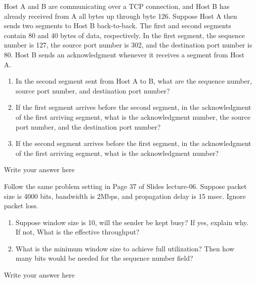 \documentclass{report}
\begin{document}
\begin{problem}

Host A and B are communicating over a TCP connection, and Host B has
already received from A all bytes up through byte 126. Suppose Host A then
sends two segments to Host B back-to-back. The first and second segments
contain 80 and 40 bytes of data, respectively. In the first segment, the
sequence number is 127, the source port number is 302, and the destination
port number is 80. Host B sends an acknowledgment whenever it receives a
segment from Host A.

\begin{enumerate}
\item In the second segment sent from Host A to B, what are the sequence number, source port number, and destination port number?

\item If the first segment arrives before the second segment, in the acknowledgment of the first arriving segment, what is the acknowledgment number, the source port number, and the destination port number?

\item If the second segment arrives before the first segment, in the acknowledgment of the first arriving segment, what is the acknowledgment number?

\end{enumerate}

\begin{answer}{40em}
    Write your answer here
\end{answer}

\end{problem}

\newpage

\begin{problem}
Follow the same problem setting in Page 37 of Slides lecture-06. Suppose packet size is 4000 bits, bandwidth is 2Mbps, and propagation delay is 15 msec. Ignore packet loss.

\begin{enumerate}
\item Suppose window size is 10, will the sender be kept busy? If yes, explain why. If not, What is the effective throughput? 
\item What is the minimum window size to achieve full utilization? Then how many bits would be needed for the sequence number field?
\end{enumerate}

\begin{answer}{35em}
  Write your answer here
\end{answer}

\end{problem}
\end{document}
